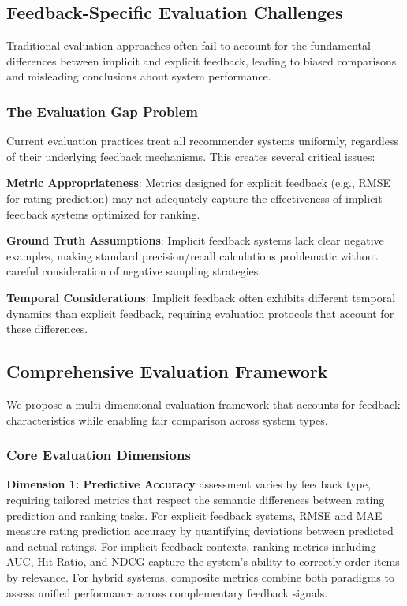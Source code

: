 \subsection{Feedback-Specific Evaluation Challenges}

Traditional evaluation approaches often fail to account for the fundamental differences between implicit and explicit feedback, leading to biased comparisons and misleading conclusions about system performance.

\subsubsection{The Evaluation Gap Problem}
Current evaluation practices treat all recommender systems uniformly, regardless of their underlying feedback mechanisms. This creates several critical issues:

\textbf{Metric Appropriateness}: Metrics designed for explicit feedback (e.g., RMSE for rating prediction) may not adequately capture the effectiveness of implicit feedback systems optimized for ranking.

\textbf{Ground Truth Assumptions}: Implicit feedback systems lack clear negative examples, making standard precision/recall calculations problematic without careful consideration of negative sampling strategies.

\textbf{Temporal Considerations}: Implicit feedback often exhibits different temporal dynamics than explicit feedback, requiring evaluation protocols that account for these differences.

\subsection{Comprehensive Evaluation Framework}

We propose a multi-dimensional evaluation framework that accounts for feedback characteristics while enabling fair comparison across system types.

\subsubsection{Core Evaluation Dimensions}

\textbf{Dimension 1: Predictive Accuracy} assessment varies by feedback type, requiring tailored metrics that respect the semantic differences between rating prediction and ranking tasks. For explicit feedback systems, RMSE and MAE measure rating prediction accuracy by quantifying deviations between predicted and actual ratings. For implicit feedback contexts, ranking metrics including AUC, Hit Ratio, and NDCG capture the system's ability to correctly order items by relevance. For hybrid systems, composite metrics combine both paradigms to assess unified performance across complementary feedback signals.

